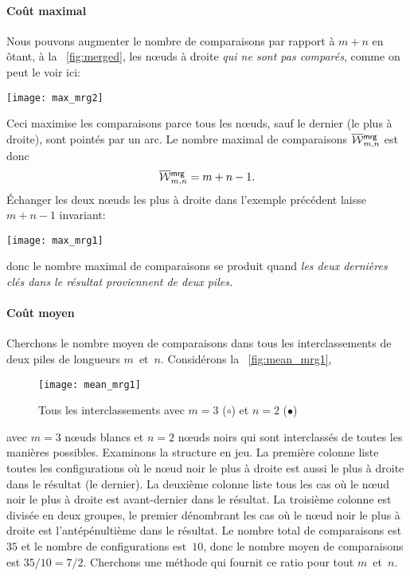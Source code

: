 \paragraph{Coût maximal}

Nous pouvons augmenter le nombre de comparaisons par rapport à \(m+n\)
en ôtant, à la \fig~\vref{fig:merged}, les nœuds à droite
\emph{qui ne sont pas comparés}, comme on peut le voir ici:
\begin{center}
\texttt{[image: max\_mrg2]}
\end{center}
Ceci maximise les comparaisons parce tous les nœuds, sauf le
dernier (le plus à droite), sont pointés par un arc. Le nombre maximal
de comparaisons
\(\OW{\fun{mrg}}{m,n}\) est donc
\begin{equation}
\OW{\fun{mrg}}{m,n} = m + n - 1.\label{eq:worst_merge}
\end{equation}
Échanger les deux nœuds les plus à droite dans l'exemple précédent
laisse \(m+n-1\) invariant:
\begin{center}
\texttt{[image: max\_mrg1]}
\end{center}
donc le nombre maximal de comparaisons se produit quand \emph{les deux
  dernières clés dans le résultat proviennent de deux piles.}


\paragraph{Coût moyen}

Cherchons le nombre moyen de comparaisons dans tous les
interclassements de deux piles de longueurs
\(m\)~et~\(n\). Considérons la \fig~\vref{fig:mean_mrg1},
\begin{figure}[b]
\centering
\texttt{[image: mean\_mrg1]}
\caption{Tous les interclassements avec \(m=3\) (\(\circ\)) et \(n=2\)
  (\(\bullet\))}
\label{fig:mean_mrg1}
\end{figure}
avec \(m=3\) nœuds blancs et \(n=2\) nœuds noirs qui sont
interclassés de toutes les manières possibles. Examinons la structure
en jeu. La première colonne liste toutes les configurations où le
nœud noir le plus à droite est aussi le plus à droite dans le
résultat (le dernier). La deuxième colonne liste tous les cas où le
nœud noir le plus à droite est avant-dernier dans le résultat. La
troisième colonne est divisée en deux groupes, le premier dénombrant
les cas où le nœud noir le plus à droite est l'antépénultième dans
le résultat. Le nombre total de comparaisons est~\(35\) et le nombre
de configurations est~\(10\), donc le nombre moyen de comparaisons est
\(35/10 = 7/2\).\label{seven_two} Cherchons une méthode qui fournit ce
ratio pour tout \(m\)~et~\(n\).

